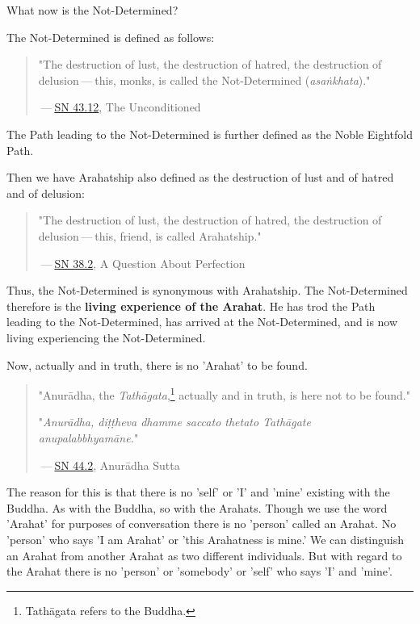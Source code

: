 What now is the Not-Determined?

The Not-Determined is defined as follows:

\begin{quote}
"The destruction of lust, the destruction of hatred, the destruction of delusion --- this, monks, is called the Not-Determined (\emph{asaṅkhata})."

 --- \href{https://suttacentral.net/sn43.12/en/bodhi}{SN 43.12}, The Unconditioned
\end{quote}

The Path leading to the Not-Determined is further defined as the Noble Eightfold Path.

Then we have Arahatship also defined as the destruction of lust and of hatred and of delusion:

\begin{quote}
"The destruction of lust, the destruction of hatred, the destruction of delusion --- this, friend, is called Arahatship."

 --- \href{https://suttacentral.net/sn38.2/en/sujato}{SN 38.2}, A Question About Perfection
\end{quote}

\protect\hypertarget{living-experience}{}{}Thus, the Not-Determined is synonymous with Arahatship. The Not-Determined therefore is the \textbf{living experience of the Arahat}. He has trod the Path leading to the Not-Determined, has arrived at the Not-Determined, and is now living experiencing the Not-Determined.

Now, actually and in truth, there is no 'Arahat' to be found.

\begin{quote}
"Anurādha, the \emph{Tathāgata},\footnote{Tathāgata refers to the Buddha.} actually and in truth, is here not to be found."

"\emph{Anurādha, diṭṭheva dhamme saccato thetato Tathāgate anupalabbhyamāne.}"

 --- \href{https://suttacentral.net/sn44.2/en/sujato}{SN 44.2}, Anurādha Sutta
\end{quote}

The reason for this is that there is no 'self' or 'I' and 'mine' existing with the Buddha. As with the Buddha, so with the Arahats. Though we use the word 'Arahat' for purposes of conversation there is no 'person' called an Arahat. No 'person' who says 'I am Arahat' or 'this Arahatness is mine.' We can distinguish an Arahat from another Arahat as two different individuals. But with regard to the Arahat there is no 'person' or 'somebody' or 'self' who says 'I' and 'mine'.

